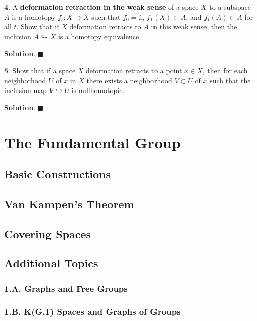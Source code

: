 \documentclass{article}
\newcommand{\identity}{\mathds{1}}
\begin{document}
\textbf{4}. A \textbf{deformation retraction in the weak sense} of a space $X$ to a subspace $A$ is a homotopy $f_{t}: X\to X$ such that $f_{0} = \identity$, $f_{1}(X)\subset A$, and $f_{t}(A)\subset A$ for all $t$. Show that if $X$ deformation retracts to $A$ in this weak sense, then the inclusion $A\hookrightarrow X$ is a homotopy equivalence.
\medskip

\textbf{Solution}. $\blacksquare$
\bigskip
\bigskip

\textbf{5}. Show that if a space $X$ deformation retracts to a point $x\in X$, then for each neighborhood $U$ of $x$ in $X$ there exists a neighborhood $V\subset U$ of $x$ such that the inclusion map $V\hookrightarrow U$ is nullhomotopic.
\medskip

\textbf{Solution}. $\blacksquare$
\newpage

\section{The Fundamental Group}

\subsection{Basic Constructions}

\subsection{Van Kampen's Theorem}

\subsection{Covering Spaces}

\subsection*{Additional Topics}

\subsubsection*{1.A. Graphs and Free Groups}

\subsubsection*{1.B. K(G,1) Spaces and Graphs of Groups}
\end{document}
